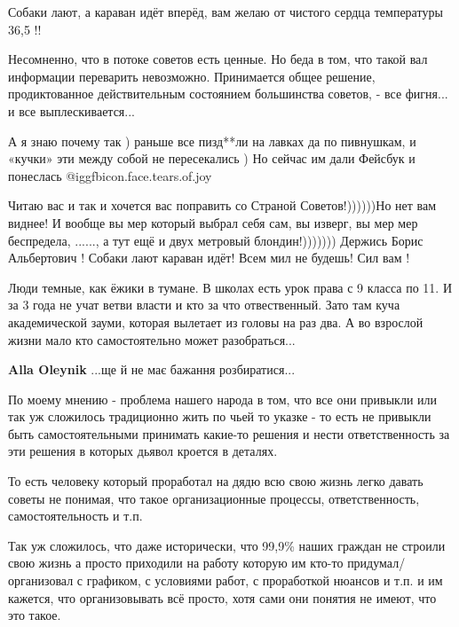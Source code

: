 \begin{itemize}

Собаки лают, а караван идёт вперёд, вам желаю от чистого сердца температуры
36,5 !!


Несомненно, что в потоке советов есть ценные. Но беда в том, что такой вал
информации переварить невозможно. Принимается общее решение, продиктованное
действительным состоянием большинства советов, - все фигня... и все
выплескивается...


А я знаю почему так ) раньше все пизд**ли на лавках да по пивнушкам, и «кучки»
эти между собой не пересекались ) Но сейчас им дали Фейсбук и понеслась  @igg{fbicon.face.tears.of.joy} 


Читаю вас и так и хочется вас поправить со Страной Советов!))))))Но нет вам виднее!
И вообще вы мер который выбрал себя сам, вы изверг, вы мер мер беспредела, ......, а тут ещё и двух метровый блондин!)))))))
Держись Борис Альбертович !
Собаки лают караван идёт!
Всем мил не будешь!
Сил вам !


Люди темные, как ёжики в тумане. В школах есть урок права с 9 класса по 11. И
за 3 года не учат ветви власти и кто за что отвественный. Зато там куча
академической зауми, которая вылетает из головы на раз два. А во взрослой жизни
мало кто самостоятельно может разобраться...

\begin{itemize} %
\textbf{Alla Oleynik} ...ще й не має бажання розбиратися...
\end{itemize} %


По моему мнению - проблема нашего народа в том, что все они привыкли или так уж
сложилось традиционно жить по чьей то указке - то есть не привыкли быть
самостоятельными принимать какие-то решения и нести ответственность за эти
решения в которых дьявол кроется в деталях.

То есть человеку который проработал на дядю всю свою жизнь легко давать советы
не понимая, что такое организационные процессы, ответственность,
самостоятельность и т.п.

Так уж сложилось, что даже исторически, что 99,9\% наших граждан не строили свою
жизнь а просто приходили на работу которую им кто-то придумал/организовал с
графиком, с условиями работ, с проработкой нюансов и т.п. и им кажется, что
организовывать всё просто, хотя сами они понятия не имеют, что это такое.


\end{itemize}
